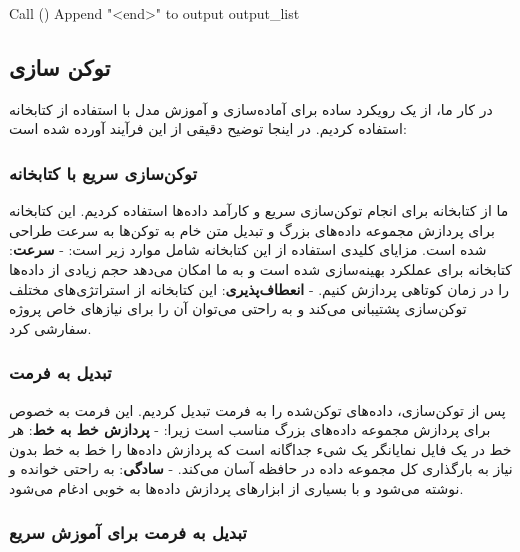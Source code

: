 \begin{LTR}
\begin{algorithm}
\begin{algorithmic}[1]
                  \State Call ()
                  \State Append "<end>" to output
                  \State \Return output\_list
                  \EndFunction
            \end{algorithmic}
      \end{algorithm}
\end{LTR}



\subsection{توکن سازی}

در کار ما، از یک رویکرد ساده برای آماده‌سازی و آموزش مدل با استفاده از
کتابخانه  \cite{Moi_HuggingFace_s_Tokenizers_2023} استفاده کردیم. در اینجا توضیح دقیقی از این فرآیند
آورده شده است:

\subsubsection{توکن‌سازی سریع با کتابخانه }

ما از کتابخانه  برای انجام توکن‌سازی سریع و کارآمد داده‌ها
استفاده کردیم. این کتابخانه برای پردازش مجموعه داده‌های بزرگ و تبدیل متن
خام به توکن‌ها به سرعت طراحی شده است. مزایای کلیدی استفاده از این
کتابخانه شامل موارد زیر است: - \textbf{سرعت}: کتابخانه  برای
عملکرد بهینه‌سازی شده است و به ما امکان می‌دهد حجم زیادی از داده‌ها را در
زمان کوتاهی پردازش کنیم. - \textbf{انعطاف‌پذیری}: این کتابخانه از
استراتژی‌های مختلف توکن‌سازی پشتیبانی می‌کند و به راحتی می‌توان آن را برای
نیازهای خاص پروژه سفارشی کرد.

\subsubsection{تبدیل به فرمت }

پس از توکن‌سازی، داده‌های توکن‌شده را به فرمت  تبدیل
کردیم. این فرمت به خصوص برای پردازش مجموعه داده‌های بزرگ مناسب است زیرا:
- \textbf{پردازش خط به خط}: هر خط در یک فایل  نمایانگر یک شیء 
جداگانه است که پردازش داده‌ها را خط به خط بدون نیاز به بارگذاری کل مجموعه
داده در حافظه آسان می‌کند. - \textbf{سادگی}:  به راحتی خوانده و
نوشته می‌شود و با بسیاری از ابزارهای پردازش داده‌ها به خوبی ادغام می‌شود.

\subsubsection{تبدیل به فرمت  برای آموزش سریع}

